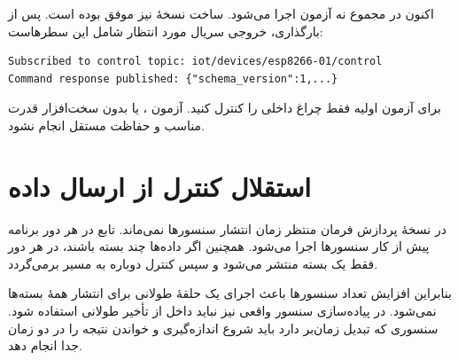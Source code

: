 اکنون در مجموع نه آزمون اجرا می‌شود. ساخت نسخهٔ
نیز موفق بوده است. پس از بارگذاری، خروجی سریال مورد انتظار شامل این سطرهاست:

\begin{LTR}
\begin{lstlisting}
Subscribed to control topic: iot/devices/esp8266-01/control
Command response published: {"schema_version":1,...}
\end{lstlisting}
\end{LTR}

برای آزمون اولیه فقط چراغ داخلی را کنترل کنید. آزمون
،
یا
بدون سخت‌افزار قدرت مناسب و حفاظت مستقل انجام نشود.

\section{استقلال کنترل از ارسال داده}
در نسخهٔ
پردازش فرمان منتظر زمان انتشار سنسورها نمی‌ماند. تابع
در هر دور برنامه پیش از کار سنسورها اجرا می‌شود. همچنین اگر داده‌ها چند بسته باشند، در هر دور فقط یک بسته منتشر می‌شود و سپس کنترل دوباره به مسیر
برمی‌گردد.

بنابراین افزایش تعداد سنسورها باعث اجرای یک حلقهٔ طولانی برای انتشار همهٔ بسته‌ها نمی‌شود. در پیاده‌سازی سنسور واقعی نیز نباید داخل
از تأخیر طولانی استفاده شود. سنسوری که تبدیل زمان‌بر دارد باید شروع اندازه‌گیری و خواندن نتیجه را در دو زمان جدا انجام دهد.
